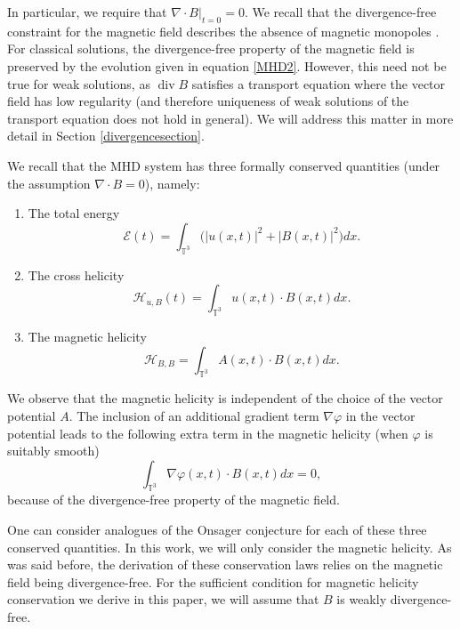 \documentclass[12pt,a4paper]{article}
\theoremstyle{definition}
\theoremstyle{remark}
\numberwithin{equation}{section}
\DeclareMathOperator{\Div}{div}
\begin{document}
In particular, we require that $\nabla \cdot B \lvert_{t= 0} = 0$. We recall that the divergence-free constraint for the magnetic field describes the absence of magnetic monopoles \cite{goedbloed}. For classical solutions, the divergence-free property of the magnetic field is preserved by the evolution given in equation \eqref{MHD2}. However, this need not be true for weak solutions, as $\Div B$ satisfies a transport equation where the vector field has low regularity (and therefore uniqueness of weak solutions of the transport equation does not hold in general). We will address this matter in more detail in Section \ref{divergencesection}. 

We recall that the MHD system has three formally conserved quantities (under the assumption $\nabla \cdot B = 0$), namely:
\begin{enumerate}
    \item The total energy
    \begin{equation}
    \mathcal{E} (t) = \int_{\mathbb{T}^3} \big( \lvert u(x,t) \rvert^2 + \lvert B(x,t) \rvert^2 \big) dx.
    \end{equation}
    \item The cross helicity
    \begin{equation}
    \mathcal{H}_{u,B} (t) = \int_{\mathbb{T}^3} u(x,t) \cdot B(x,t) dx.
    \end{equation}
    \item The magnetic helicity
    \begin{equation} \label{magnetichelicity}
    \mathcal{H}_{B,B} = \int_{\mathbb{T}^3} A(x,t) \cdot B(x,t) dx. 
    \end{equation}
\end{enumerate}
We observe that the magnetic helicity is independent of the choice of the vector potential $A$. The inclusion of an additional gradient term $\nabla \varphi$ in the vector potential leads to the following extra term in the magnetic helicity (when $\varphi$ is suitably smooth)
\begin{equation*}
\int_{\mathbb{T}^3} \nabla \varphi (x,t) \cdot B(x,t) dx = 0,
\end{equation*}
because of the divergence-free property of the magnetic field.

One can consider analogues of the Onsager conjecture for each of these three conserved quantities. In this work, we will only consider the magnetic helicity. As was said before, the derivation of these conservation laws relies on the magnetic field being divergence-free. For the sufficient condition for magnetic helicity conservation we derive in this paper, we will assume that $B$ is weakly divergence-free.
\end{document}
